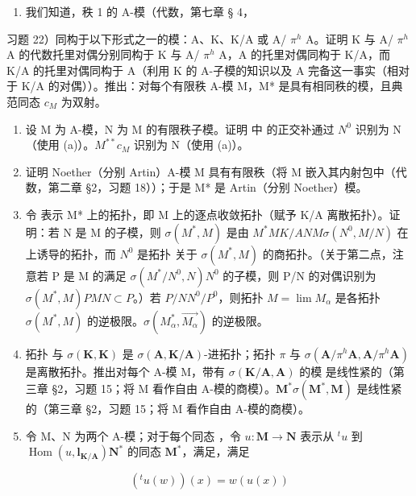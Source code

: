 \begin{enumerate}
\def\labelenumi{(\alph{enumi})}
\tightlist
\item
  我们知道，秩 1 的 A-模（代数，第七章 § 4，
\end{enumerate}

习题 22）同构于以下形式之一的模：A、K、K/A 或 A/ \(\pi^{h}\) A。证明 K 与 A/ \(\pi^{h}\) A 的代数托里对偶分别同构于 K 与 A/ \(\pi^{h}\) A，A 的托里对偶同构于 K/A，而 K/A 的托里对偶同构于 A（利用 K 的 A-子模的知识以及 A 完备这一事实（相对于 K/A 的对偶））。推出：对每个有限秩 A-模 M，M* 是具有相同秩的模，且典范同态 \(c_{M}\) 为双射。

\begin{enumerate}
\def\labelenumi{(\alph{enumi})}
\setcounter{enumi}{1}
\item
  设 M 为 A-模，N 为 M 的有限秩子模。证明  中  的正交补通过 \(N^{0}\) 识别为 N（使用 (a)）。\(M^{**}\)\(c_{M}\) 识别为 N（使用 (a)）。
\item
  证明 Noether（分别 Artin）A-模 M 具有有限秩（将 M 嵌入其内射包中（代数，第二章 §2，习题 18））；于是 M* 是 Artin（分别 Noether）模。
\item
  令  表示 M* 上的拓扑，即 M 上的逐点收敛拓扑（赋予 K/A 离散拓扑）。证明：若 N 是 M 的子模，则 \(\sigma(M^{*}, M)\) 是由 \(M^{*}\)\(M\)\(K/A\)\(N\)\(M\)\(\sigma(N^{0}, M/N)\) 在  上诱导的拓扑，而 \(N^{0}\) 是拓扑  关于 \(\sigma(M^{*}, M)\) 的商拓扑。（关于第二点，注意若 P 是 M 的满足 \(\sigma(M^{*}/N^{0}, N)\)\(N^{0}\) 的子模，则 P/N 的对偶识别为 \(\sigma(M^{*}, M)\)\(P\)\(M\)\(N \subset P\)。）若 \(P/N\)\(N^{0}/P^{0}\)，则拓扑 \(M = \lim M_{\alpha}\) 是各拓扑 \(\sigma(M^{*}, M)\) 的逆极限。\(\sigma(M_{\alpha}^{*}, \overrightarrow{M_{\alpha}})\) 的逆极限。
\item
  拓扑  与 \(\sigma(\mathbf{K},\mathbf{K})\) 是 \(\sigma(\mathbf{A},\mathbf{K}/\mathbf{A})\)-进拓扑；拓扑 \(\pi\) 与 \(\sigma(\mathbf{A}/\pi^{h}\mathbf{A},\mathbf{A}/\pi^{h}\mathbf{A})\) 是离散拓扑。推出对每个 A-模 M，带有 \(\sigma(\mathbf{K}/\mathbf{A},\mathbf{A})\) 的模  是线性紧的（第三章 §2，习题 15；将 M 看作自由 A-模的商模）。\(\mathbf{M}^{*}\)\(\sigma(\mathbf{M}^{*},\mathbf{M})\) 是线性紧的（第三章 §2，习题 15；将 M 看作自由 A-模的商模）。
\item
  令 M、N 为两个 A-模；对于每个同态 ，令 \(u: \mathbf{M} \to \mathbf{N}\) 表示从 \(^{t}u\) 到 \(\operatorname{Hom}(u, \mathbf{l}_{\mathbf{K/A}})\)\(\mathbf{N}^{*}\) 的同态 \(\mathbf{M}^{*}\)，满足，满足
\end{enumerate}

\[
\left(^ {t} u (w)\right) (x) = w (u (x))
\]

